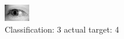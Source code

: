 \begin{figure}[h!]
\begin{center}
\includegraphics[width=0.60\columnwidth]{figures/ID3179_class_3_target_4.png}
\end{center}
\caption{ Classification: 3 actual target: 4}
\label{fig:ID3179_class_3_target_4}
\end{figure}
